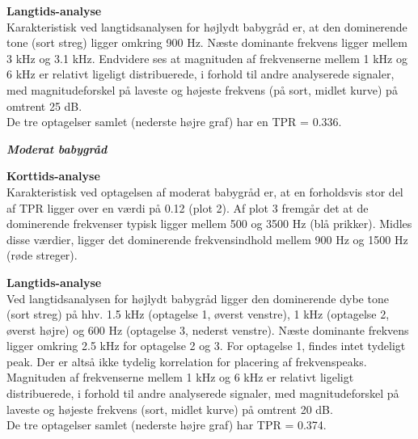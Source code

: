 
\newpage
\textbf{Langtids-analyse} \\
Karakteristisk ved langtidsanalysen for højlydt babygråd er, at den dominerende tone (sort streg) ligger omkring 900 Hz. Næste dominante frekvens ligger mellem 3 kHz og 3.1 kHz. Endvidere ses at magnituden af frekvenserne mellem 1 kHz og 6 kHz er relativt ligeligt distribuerede, i forhold til andre analyserede signaler, med magnitudeforskel på laveste og højeste frekvens (på sort, midlet kurve) på omtrent 25 dB. \\
De tre optagelser samlet (nederste højre graf) har en TPR = 0.336.



\newpage
\begin{center} \textit{\textbf{Moderat babygråd}} \end{center}
\textbf{Korttids-analyse} \\
Karakteristisk ved optagelsen af moderat babygråd er, at en forholdsvis stor del af TPR ligger over en værdi på 0.12 (plot 2). Af plot 3 fremgår det at de dominerende frekvenser typisk ligger mellem 500 og 3500 Hz (blå prikker). Midles disse værdier, ligger det dominerende frekvensindhold mellem 900 Hz og 1500 Hz (røde streger). 


\newpage
\textbf{Langtids-analyse} \\
Ved langtidsanalysen for højlydt babygråd ligger den dominerende dybe tone (sort streg) på hhv. 1.5 kHz (optagelse 1, øverst venstre), 1 kHz (optagelse 2, øverst højre) og 600 Hz (optagelse 3, nederst venstre). Næste dominante frekvens ligger omkring 2.5 kHz for optagelse 2 og 3. For optagelse 1, findes intet tydeligt peak. Der er altså ikke tydelig korrelation for placering af frekvenspeaks. Magnituden af frekvenserne mellem 1 kHz og 6 kHz er relativt ligeligt distribuerede, i forhold til andre analyserede signaler, med magnitudeforskel på laveste og højeste frekvens (sort, midlet kurve) på omtrent 20 dB. \\
De tre optagelser samlet (nederste højre graf) har TPR = 0.374.

